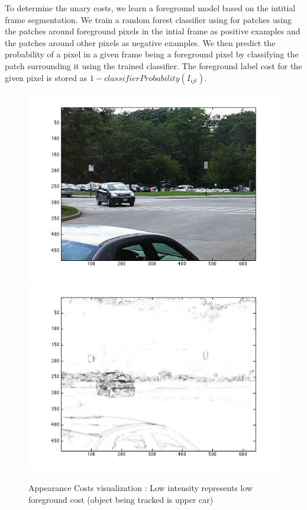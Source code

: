 To determine the unary costs, we learn a foreground model based on
the intitial frame segmentation. We train a random forest classifier
using for patches using the patches around foreground pixels in the
intial frame as positive examples and the patches around other pixels
as negative examples. We then predict the probability of a pixel in
a given frame being a foreground pixel by classifying the patch surrounding
it using the trained classifier. The foreground label cost for the
given pixel is stored as $1-classifierProbability(I_{ijt})$.

\begin{figure}[t]
\begin{centering}
\includegraphics[scale=0.4]{figures/UnaryCostGT}\includegraphics[scale=0.4]{figures/UnaryCost}\caption{Appearance Costs visualization : Low intensity represents low foreground cost
(object being tracked is upper car)}
\par\end{centering}
\end{figure}

